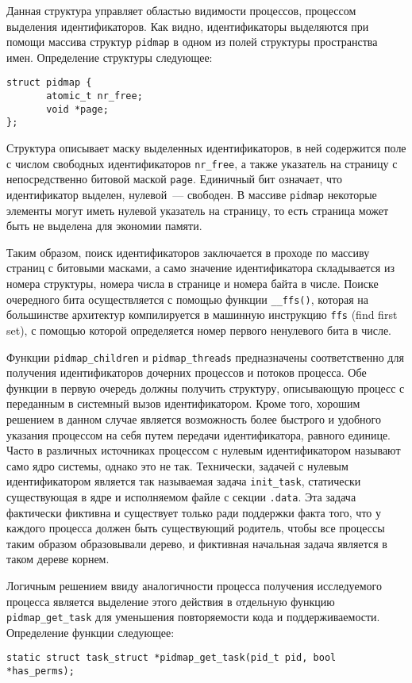 Данная структура управляет областью видимости процессов, процессом выделения
идентификаторов. Как видно, идентификаторы выделяются при помощи массива
структур \texttt{pidmap} в одном из полей структуры пространства имен.
Определение структуры следующее:
\medskip
\begin{lstlisting}[style=cstyle]
struct pidmap {
       atomic_t nr_free;
       void *page;
};
\end{lstlisting}
\medskip

Структура описывает маску выделенных идентификаторов, в ней содержится поле с
числом свободных идентификаторов \texttt{nr\_free}, а также указатель на
страницу с непосредственно битовой маской \texttt{page}. Единичный бит означает,
что идентификатор выделен, нулевой~--- свободен. В массиве \texttt{pidmap}
некоторые элементы могут иметь нулевой указатель на страницу, то есть страница
может быть не выделена для экономии памяти.

Таким образом, поиск идентификаторов заключается в проходе по массиву страниц с
битовыми масками, а само значение идентификатора складывается из номера
структуры, номера числа в странице и номера байта в числе. Поиске очередного
бита осуществляется с помощью функции \texttt{\_\_ffs()}, которая на большинстве
архитектур компилируется в машинную инструкцию \texttt{ffs} (find first set), с
помощью которой определяется номер первого ненулевого бита в числе.

Функции \texttt{pidmap\_children} и \texttt{pidmap\_threads} предназначены
соответственно для получения идентификаторов дочерних процессов и потоков
процесса. Обе функции в первую очередь должны получить структуру, описывающую
процесс с переданным в системный вызов идентификатором. Кроме того, хорошим
решением в данном случае является возможность более быстрого и удобного указания
процессом на себя путем передачи идентификатора, равного единице. Часто в
различных источниках процессом с нулевым идентификатором называют само ядро
системы, однако это не так. Технически, задачей с нулевым идентификатором
является так называемая задача \texttt{init\_task}, статически существующая в
ядре и исполняемом файле с секции \texttt{.data}. Эта задача фактически фиктивна
и существует только ради поддержки факта того, что у каждого процесса должен
быть существующий родитель, чтобы все процессы таким образом образовывали
дерево, и фиктивная начальная задача является в таком дереве корнем.

Логичным решением ввиду аналогичности процесса получения исследуемого процесса
является выделение этого действия в отдельную функцию \texttt{pidmap\_get\_task}
для уменьшения повторяемости кода и поддерживаемости. Определение функции
следующее:
\medskip
\begin{lstlisting}[style=cstyle]
static struct task_struct *pidmap_get_task(pid_t pid, bool *has_perms);
\end{lstlisting}
\medskip

